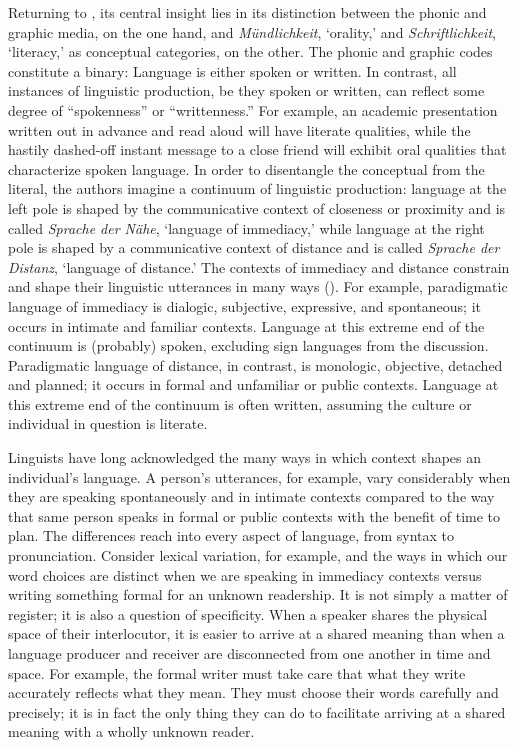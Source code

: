 Returning to \citet{KochOesterreicher1985}, its central insight lies in its distinction between the phonic and graphic media, on the one hand, and \textit{Mündlichkeit}, ‘orality,’ and \textit{Schriftlichkeit}, ‘literacy,’ as conceptual categories, on the other. The phonic and graphic codes constitute a binary: Language is either spoken or written. In contrast, all instances of linguistic production, be they spoken or written, can reflect some degree of “spokenness” or “writtenness.” For example, an academic presentation written out in advance and read aloud will have literate qualities, while the hastily dashed-off instant message to a close friend will exhibit oral qualities that characterize spoken language. In order to disentangle the conceptual from the literal, the authors imagine a continuum of linguistic production: language at the left pole is shaped by the communicative context of closeness or proximity and is called \textit{Sprache der Nähe}, ‘language of immediacy,’ while language at the right pole is shaped by a communicative context of distance and is called \textit{Sprache der Distanz}, ‘language of distance.’ The contexts of immediacy and distance constrain and shape their linguistic utterances in many ways (\citealt[23]{KochOesterreicher1985}). For example, paradigmatic language of immediacy is dialogic, subjective, expressive, and spontaneous; it occurs in intimate and familiar contexts. Language at this extreme end of the continuum is (probably) spoken, excluding sign languages from the discussion. Paradigmatic language of distance, in contrast, is monologic, objective, detached and planned; it occurs in formal and unfamiliar or public contexts. Language at this extreme end of the continuum is often written, assuming the culture or individual in question is literate.

Linguists have long acknowledged the many ways in which context shapes an individual’s language. A person’s utterances, for example, vary considerably when they are speaking spontaneously and in intimate contexts compared to the way that same person speaks in formal or public contexts with the benefit of time to plan. The differences reach into every aspect of language, from syntax to pronunciation. Consider lexical variation, for example, and the ways in which our word choices are distinct when we are speaking in immediacy contexts versus writing something formal for an unknown readership. It is not simply a matter of register; it is also a question of specificity. When a speaker shares the physical space of their interlocutor, it is easier to arrive at a shared meaning than when a language producer and receiver are disconnected from one another in time and space. For example, the formal writer must take care that what they write accurately reflects what they mean. They must choose their words carefully and precisely; it is in fact the only thing they can do to facilitate arriving at a shared meaning with a wholly unknown reader.

